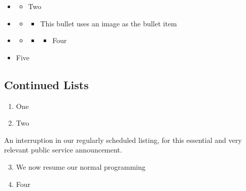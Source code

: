 \documentclass[\officeparserdriver 12pt]{article}
\begin{document}
\begin{itemize}
\item[]
\begin{itemize}
\item Two
\end{itemize}
\end{itemize}

\begin{itemize}
\item[]
\begin{itemize}
\item[]
\begin{itemize}
\item This bullet uses an image as the bullet item
\end{itemize}
\end{itemize}
\end{itemize}

\begin{itemize}
\item[]
\begin{itemize}
\item[]
\begin{itemize}
\item[]
\begin{itemize}
\item[{o}] Four
\end{itemize}
\end{itemize}
\end{itemize}
\end{itemize}

\begin{itemize}
\item[{▪}] Five
\end{itemize}

\subsection[{Continued Lists}]{\protect\textcolor{hex4F81BD}{Continued Lists}}\label{continued-lists}

\begin{enumerate}
\item[{i.}] One
\item[{ii.}] Two
\end{enumerate}

An interruption in our regularly scheduled listing, for this essential and very relevant public service announcement.

\begin{enumerate}
\setcounter{enumi}{2}
\item[{iii.}] We now resume our normal programming
\item[{iv.}] Four
\end{enumerate}
\end{document}

